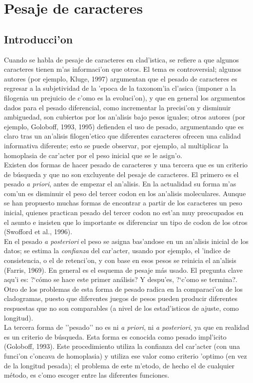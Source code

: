 \chapter{Pesaje de caracteres}
\section*{Introducci'on}
Cuando se habla de pesaje de caracteres en clad'istica, se refiere a que algunos caracteres tienen m'as informaci'on que otros. El tema es controversial; algunos autores (por ejemplo, Kluge, 1997) argumentan que el pesado de caracteres es regresar a la subjetividad de la 'epoca de la taxonom'ia cl'asica (imponer a la filogenia un prejuicio de c'omo es la evoluci'on), y que en general los argumentos dados para el pesado diferencial, como incrementar la precisi'on y disminuir ambiguedad, son cubiertos por los an'alisis bajo pesos iguales; otros autores (por ejemplo, Goloboff, 1993, 1995) defienden el uso de pesado, argumentando que es claro tras un an'alisis filogen'etico que diferentes caracteres ofrecen una calidad informativa diferente; esto se puede observar, por ejemplo, al multiplicar la homoplasia de car'acter por el peso inicial que se le asign'o.\\
Existen dos formas de hacer pesado de caracteres y una tercera que es un criterio de b\'usqueda y que no son excluyente del pesaje de caracteres. El primero es el pesado \textit{a priori}, antes de empezar el an'alisis. 
En la actualidad su forma m'as com'un es disminuir el peso del tercer codon en los an'alisis moleculares. Aunque se han propuesto muchas formas de encontrar a partir de los caracteres un peso inicial, quienes practican pesado del tercer codon no est'an muy preocupados en el asunto e insisten que lo importante es diferenciar un tipo de codon de los otros (Swofford et al., 1996).\\
En el pesado \textit{a posteriori} el peso se asigna bas'andose en un an'alisis inicial de los datos; se estima la \textit{confianza} del car'acter, usando por ejemplo, el 'indice de consistencia, o el de retenci'on, y con base en esos pesos se reinicia el an'alisis (Farris, 1969). En general es el esquema de pesaje m\'as usado. El pregunta clave aqu'i es: ?`c\'omo se hace este primer an\'alisis? Y despu'es, ?`c'omo se termina?. Otro de los problemas de esta forma de pesado radica en la comparaci'on de los cladogramas, puesto que diferentes juegos de pesos pueden producir diferentes respuestas que no son comparables (a nivel de los estad'isticos de ajuste, como longitud).\\
La tercera forma de ''pesado'' no es ni \textit{a priori}, ni \textit{a posteriori}, ya que en realidad es un criterio de b\'usqueda. Esta forma es conocida como pesado impl'icito (Goloboff, 1993). Este procedimiento utiliza la confianza del car'acter (con una funci'on c'oncava de homoplasia) y utiliza ese valor como criterio 'optimo (en vez de la longitud pesada); el problema de este m'etodo, de hecho el de cualquier m\'etodo, es c'omo escoger entre las diferentes funciones.
